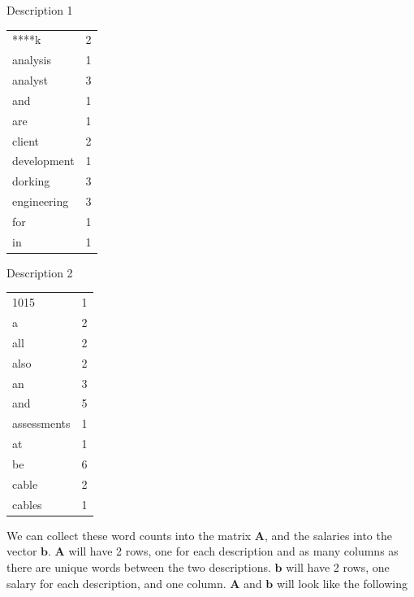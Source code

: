 \documentclass[12pt]{article}
\begin{document}
    \begin{center}
    \begin{minipage}[t]{.4\textwidth}
    Description 1
    \newline
    \newline
        \begin{tabular}{l|c}
            ****k & 2 \\
            analysis & 1\\
            analyst & 3\\
            and & 1\\
            are & 1\\
            client & 2\\
            development & 1\\
            dorking & 3\\
            engineering & 3\\
            for & 1\\
            in & 1
        \end{tabular}
    \end{minipage}
    \begin{minipage}[t]{.4\textwidth}
    Description 2
    \newline
    \newline
        \begin{tabular}{l|c}
            1015 & 1 \\
            a & 2 \\
            all & 2 \\
            also & 2\\
            an & 3 \\
            and & 5 \\
            assessments & 1 \\
            at & 1 \\
            be & 6 \\
            cable & 2 \\
            cables & 1
        \end{tabular}
    \end{minipage}
    \end{center}

    We can collect these word counts into the matrix $\bm{A}$, and the salaries
    into the vector $\bm{b}$. $\bm{A}$ will have 2 rows, one for each
    description and as many columns as there are unique words between the two
    descriptions. $\bm{b}$ will have 2 rows, one salary for each description,
    and one column. $\bm{A}$ and $\bm{b}$ will look like the following
\end{document}
